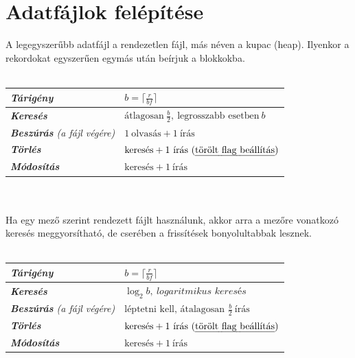 \documentclass[12pt,margin=0px]{article}
\newcommand\ddfrac[2]{\frac{\displaystyle #1}{\displaystyle #2}}
\begin{document}
    \section*{Adatfájlok felépítése}
    A legegyszerűbb adatfájl a rendezetlen fájl, más néven a kupac (heap). Ilyenkor a rekordokat egyszerűen egymás után beírjuk a blokkokba.\\\\
    \renewcommand{\arraystretch}{1.5}
    \begin{tabular}{|l|l|}
       \hline
       \textit{\textbf{Tárigény}}                  & $b=\lceil \ddfrac{r}{bf}\rceil$
       \\ \hline
       \textit{\textbf{Keresés}}                   & $\text{átlagosan}\ \ddfrac{b}{2},\ \text{legrosszabb esetben}\ b$
       \\ \hline
       \textit{\textbf{Beszúrás} (a fájl végére)}  & $1\ \text{olvasás} + 1\ \text{írás}$
       \\ \hline
       \textit{\textbf{Törlés}}                    & $\text{keresés} + 1\ \text{írás (\emph{törölt flag beállítás})}$
       \\ \hline
       \textit{\textbf{Módosítás}}                 & $\text{keresés} + 1\ \text{írás}$
       \\ \hline
    \end{tabular}
    \renewcommand{\arraystretch}{1}\\\\

    \noindent Ha egy mező szerint rendezett fájlt használunk, akkor arra a mezőre vonatkozó keresés meggyorsítható, de cserében a frissítések bonyolultabbak lesznek.\\\\
    \renewcommand{\arraystretch}{1.5}
    \begin{tabular}{|l|l|}
       \hline
       \textit{\textbf{Tárigény}}                  & $b=\lceil \ddfrac{r}{bf}\rceil$
       \\ \hline
       \textit{\textbf{Keresés}}                   & $\log_{2}b,\ \textit{logaritmikus keresés}$
       \\ \hline
       \textit{\textbf{Beszúrás} (a fájl végére)}  & $\text{léptetni kell, átalagosan } \ddfrac{b}{2}\ \text{írás}$
       \\ \hline
       \textit{\textbf{Törlés}}                    & $\text{keresés} + 1\ \text{írás (\emph{törölt flag beállítás})}$
       \\ \hline
       \textit{\textbf{Módosítás}}                 & $\text{keresés} + 1\ \text{írás}$
       \\ \hline
    \end{tabular}
    \renewcommand{\arraystretch}{1}\\\\
\end{document}
